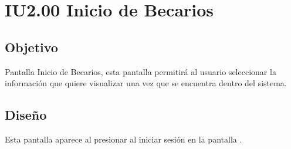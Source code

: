 \newpage
\section{IU2.00 Inicio de Becarios}

\subsection{Objetivo}
	Pantalla Inicio de Becarios, esta pantalla permitirá al usuario seleccionar la información que quiere visualizar una vez que se encuentra dentro del sistema.
	


\subsection{Diseño}
    Esta pantalla aparece al presionar al iniciar sesión en la pantalla .

	
